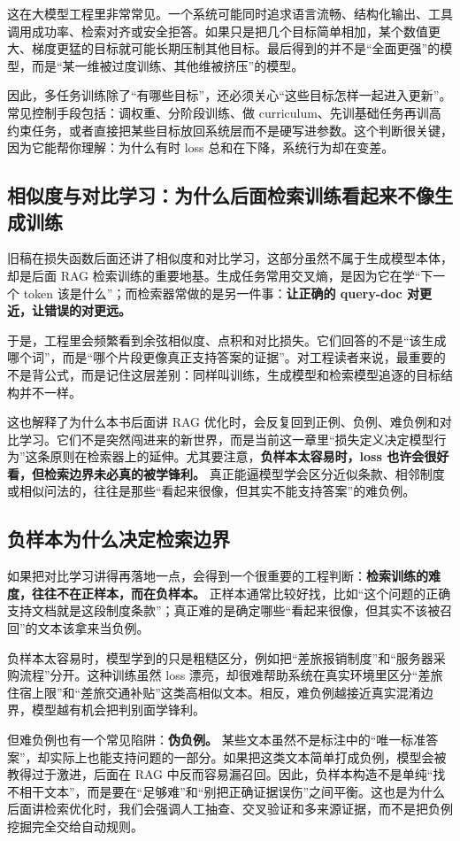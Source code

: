 这在大模型工程里非常常见。一个系统可能同时追求语言流畅、结构化输出、工具调用成功率、检索对齐或安全拒答。如果只是把几个目标简单相加，某个数值更大、梯度更猛的目标就可能长期压制其他目标。最后得到的并不是“全面更强”的模型，而是“某一维被过度训练、其他维被挤压”的模型。

因此，多任务训练除了“有哪些目标”，还必须关心“这些目标怎样一起进入更新”。常见控制手段包括：调权重、分阶段训练、做 curriculum、先训基础任务再训高约束任务，或者直接把某些目标放回系统层而不是硬写进参数。这个判断很关键，因为它能帮你理解：为什么有时 loss 总和在下降，系统行为却在变差。

\subsection{相似度与对比学习：为什么后面检索训练看起来不像生成训练}
旧稿在损失函数后面还讲了相似度和对比学习，这部分虽然不属于生成模型本体，却是后面 RAG 检索训练的重要地基。生成任务常用交叉熵，是因为它在学“下一个 token 该是什么”；而检索器常做的是另一件事：\textbf{让正确的 query-doc 对更近，让错误的对更远。}

于是，工程里会频繁看到余弦相似度、点积和对比损失。它们回答的不是“该生成哪个词”，而是“哪个片段更像真正支持答案的证据”。对工程读者来说，最重要的不是背公式，而是记住这层差别：同样叫训练，生成模型和检索模型追逐的目标结构并不一样。

这也解释了为什么本书后面讲 RAG 优化时，会反复回到正例、负例、难负例和对比学习。它们不是突然闯进来的新世界，而是当前这一章里“损失定义决定模型行为”这条原则在检索器上的延伸。尤其要注意，\textbf{负样本太容易时，loss 也许会很好看，但检索边界未必真的被学锋利。} 真正能逼模型学会区分近似条款、相邻制度或相似问法的，往往是那些“看起来很像，但其实不能支持答案”的难负例。

\subsection{负样本为什么决定检索边界}
如果把对比学习讲得再落地一点，会得到一个很重要的工程判断：\textbf{检索训练的难度，往往不在正样本，而在负样本。} 正样本通常比较好找，比如“这个问题的正确支持文档就是这段制度条款”；真正难的是确定哪些“看起来很像，但其实不该被召回”的文本该拿来当负例。

负样本太容易时，模型学到的只是粗糙区分，例如把“差旅报销制度”和“服务器采购流程”分开。这种训练虽然 loss 漂亮，却很难帮助系统在真实环境里区分“差旅住宿上限”和“差旅交通补贴”这类高相似文本。相反，难负例越接近真实混淆边界，模型越有机会把判别面学锋利。

但难负例也有一个常见陷阱：\textbf{伪负例。} 某些文本虽然不是标注中的“唯一标准答案”，却实际上也能支持问题的一部分。如果把这类文本简单打成负例，模型会被教得过于激进，后面在 RAG 中反而容易漏召回。因此，负样本构造不是单纯“找不相干文本”，而是要在“足够难”和“别把正确证据误伤”之间平衡。这也是为什么后面讲检索优化时，我们会强调人工抽查、交叉验证和多来源证据，而不是把负例挖掘完全交给自动规则。

